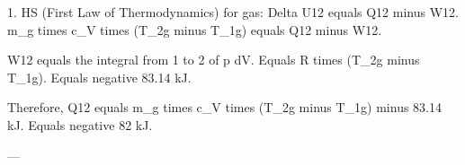 1. HS (First Law of Thermodynamics) for gas:  
Delta U12 equals Q12 minus W12.  
m_g times c_V times (T_2g minus T_1g) equals Q12 minus W12.  

W12 equals the integral from 1 to 2 of p dV.  
Equals R times (T_2g minus T_1g).  
Equals negative 83.14 kJ.  

Therefore, Q12 equals m_g times c_V times (T_2g minus T_1g) minus 83.14 kJ.  
Equals negative 82 kJ.  

---
